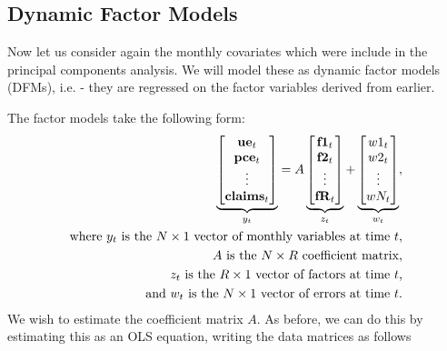 \documentclass[11pt, letterpaper]{article}\usepackage[]{graphicx}\usepackage[]{color}
\newcommand{\vv}[1]{\textcolor{black}{\mathbf{#1}}}
\begin{document}
\subsection{Dynamic Factor Models}
Now let us consider again the monthly covariates which were include in the principal components analysis. We will model these as dynamic factor models (DFMs), i.e. - they are regressed on the factor variables derived from earlier.

The factor models take the following form:
\begin{align*}
\underbrace{\begin{bmatrix}
	\vv{ue}_t\\
	\vv{pce}_t\\
	\vdots \\
	\vv{claims}_t
\end{bmatrix}}_{y_t}
=
A
\underbrace{\begin{bmatrix}
	\vv{f1}_{t}\\
	\vv{f2}_{t}\\
	\vdots \\
	\vv{fR}_{t}
\end{bmatrix}}_{z_t}
+
\underbrace{\begin{bmatrix}
	w1_t\\
	w2_t\\
	\vdots\\
	wN_t
\end{bmatrix}}_{w_t},\\
\text{where $y_t$ is the $N \times 1$ vector of monthly variables at time $t$,}\\
\text{$A$ is the $N \times R$ coefficient matrix,}\\
\text{$z_t$ is the $R \times 1$ vector of factors at time $t$,}\\
\text{and $w_t$ is the $N \times 1$ vector of errors at time $t$.}\\
\end{align*}
We wish to estimate the coefficient matrix $A$. As before, we can do this by estimating this as an OLS equation, writing the data matrices as follows
\end{document}
